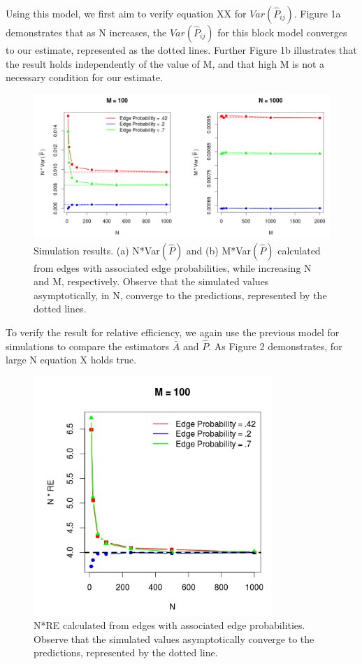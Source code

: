 Using this model, we first aim to verify equation XX for $Var(\hat{P}_{ij})$.  Figure 1a demonstrates that as N increases, the $Var(\hat{P}_{ij})$ for this block model converges to our estimate, represented as the dotted lines.  Further Figure 1b illustrates that the result holds independently of the value of M, and that high M is not a necessary condition for our estimate.
\begin{figure}[!htb]
	\centering
	\includegraphics[width=16cm]{VarNM_rho.PNG}
	\caption{Simulation results. (a) N*Var$(\hat{P})$ and  (b) M*Var$(\hat{P})$  calculated from edges with associated edge probabilities, while increasing N and M, respectively.  Observe that the simulated values asymptotically, in N, converge to the predictions, represented by the dotted lines.}
	\label{fig:plot1}
\end{figure}

To verify the result for relative efficiency, we again use the previous model for simulations to compare the estimators $\bar{A}$ and $\hat{P}$.  As Figure 2 demonstrates, for large N equation X holds true. 
\begin{figure}[!htb]
	\centering
	\includegraphics[width=9cm]{RE.PNG}
	\caption{N*RE calculated from edges with associated edge probabilities.  Observe that the simulated values asymptotically converge to the predictions, represented by the dotted line.}
	\label{fig:plot1}
\end{figure}

